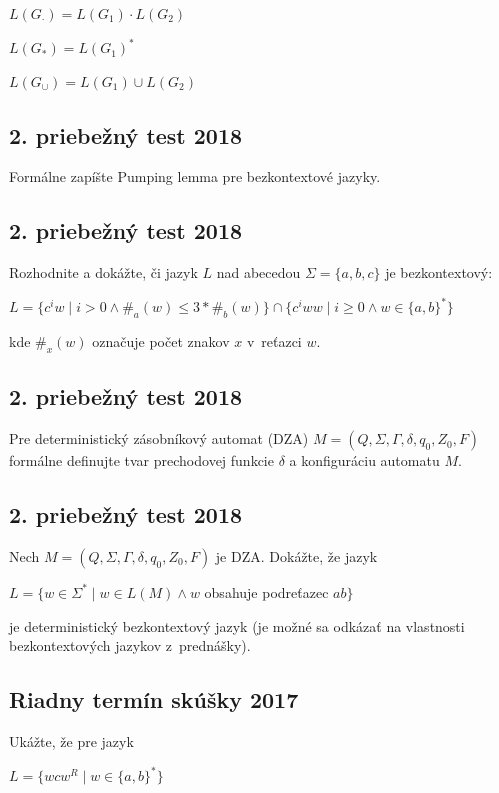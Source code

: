 \documentclass[11pt,a4paper]{article}
\begin{document}
		$L(G_{\cdot}) = L(G_1) \cdot L(G_2)$

		$L(G_{*}) = L(G_1)^*$

		$L(G_{\cup}) = L(G_1) \cup L(G_2)$

		\subsection{2. priebežný test 2018}

		Formálne zapíšte Pumping lemma pre bezkontextové jazyky.

		\subsection{2. priebežný test 2018}

		Rozhodnite a dokážte, či jazyk $L$ nad abecedou $\Sigma = \{a,b,c\}$ je bezkontextový:

		$L = \{c^iw \mid i > 0 \land \#_a(w) \leq 3 * \#_b(w)\} \cap \{c^iww \mid i \geq 0 \land w \in \{a,b\}^*\}$

		kde $\#_x(w)$ označuje počet znakov $x$ v~reťazci $w$.

		\subsection{2. priebežný test 2018}

		Pre deterministický zásobníkový automat (DZA) $M = (Q, \Sigma, \Gamma, \delta, q_0, Z_0, F)$ formálne definujte tvar prechodovej funkcie $\delta$ a konfiguráciu automatu $M$.

		\subsection{2. priebežný test 2018}

		Nech $M = (Q, \Sigma, \Gamma, \delta, q_0, Z_0, F)$ je DZA. Dokážte, že jazyk

		$L = \{w \in \Sigma^* \mid w \in L(M) \land w$ obsahuje podreťazec $ab\}$

		je deterministický bezkontextový jazyk (je možné sa odkázať na vlastnosti bezkontextových jazykov z~prednášky).

		\subsection{Riadny termín skúšky 2017}

		Ukážte, že pre jazyk

		$L = \{wcw^R \mid w \in \{a,b\}^*\}$
\end{document}
